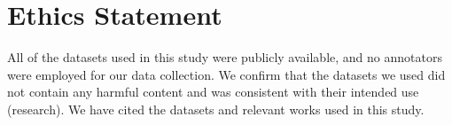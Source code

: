 \section*{Ethics Statement}
All of the datasets used in this study were publicly available, and no annotators were employed for our data collection. We confirm that the datasets we used did not contain any harmful content and was consistent with their intended use (research). We have cited the datasets and relevant works used in this study.